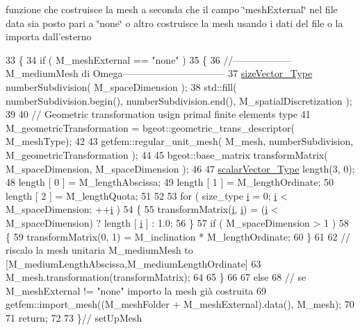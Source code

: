 funzione che costruisce la mesh a seconda che il campo \char`\"{}mesh\-External\char`\"{} nel file data sia posto pari a \char`\"{}none\char`\"{} o altro costruisce la mesh usando i dati del file o la importa dall'esterno 


\begin{DoxyCode}
33 \{
34     \textcolor{keywordflow}{if} ( M\_meshExternal == \textcolor{stringliteral}{"none"} )
35     \{
36         \textcolor{comment}{//------------------M\_mediumMesh di Omega--------------------------------}
37         \hyperlink{Core_8h_a83c51913d041a5001e8683434c09857f}{sizeVector\_Type} numberSubdivision( M\_spaceDimension );
38         std::fill( numberSubdivision.begin(), numberSubdivision.end(), M\_spatialDiscretization );
39 
40         \textcolor{comment}{// Geometric transformation usign primal finite elements type}
41         M\_geometricTransformation = bgeot::geometric\_trans\_descriptor( M\_meshType);
42 
43         getfem::regular\_unit\_mesh( M\_mesh, numberSubdivision, M\_geometricTransformation );
44 
45         bgeot::base\_matrix transformMatrix( M\_spaceDimension, M\_spaceDimension );
46 
47         \hyperlink{Core_8h_a4e75b5863535ba1dd79942de2846eff0}{scalarVector\_Type} length(3, 0);
48         length [ 0 ] = M\_lengthAbscissa;
49         length [ 1 ] = M\_lengthOrdinate;
50         length [ 2 ] = M\_lengthQuota;
51 
52 
53         \textcolor{keywordflow}{for} ( size\_type \hyperlink{matrici_8m_a6f6ccfcf58b31cb6412107d9d5281426}{i} = 0; \hyperlink{matrici_8m_a6f6ccfcf58b31cb6412107d9d5281426}{i} < M\_spaceDimension; ++\hyperlink{matrici_8m_a6f6ccfcf58b31cb6412107d9d5281426}{i} )
54         \{
55             transformMatrix(\hyperlink{matrici_8m_a6f6ccfcf58b31cb6412107d9d5281426}{i}, \hyperlink{matrici_8m_a6f6ccfcf58b31cb6412107d9d5281426}{i}) = (\hyperlink{matrici_8m_a6f6ccfcf58b31cb6412107d9d5281426}{i} < M\_spaceDimension) ? length [ \hyperlink{matrici_8m_a6f6ccfcf58b31cb6412107d9d5281426}{i} ] : 1.0;
56         \}
57         \textcolor{keywordflow}{if} ( M\_spaceDimension > 1 )
58         \{
59             transformMatrix(0, 1) = M\_inclination * M\_lengthOrdinate;
60         \}
61 
62         \textcolor{comment}{// riscalo la mesh unitaria M\_mediumMesh to [M\_mediumLengthAbscissa,M\_mediumLengthOrdinate]}
63         M\_mesh.transformation(transformMatrix);
64 
65     \}
66 
67     \textcolor{keywordflow}{else}
68         \textcolor{comment}{// se M\_meshExternal != "none" importo la mesh già costruita}
69         getfem::import\_mesh((M\_meshFolder + M\_meshExternal).data(), M\_mesh);
70     
71     \textcolor{keywordflow}{return};
72 
73 \}\textcolor{comment}{// setUpMesh}
\end{DoxyCode}
